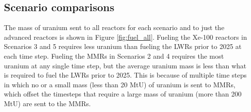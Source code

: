 \subsection{Scenario comparisons}
The mass of uranium sent to all reactors for each scenario and to just the 
advanced reactors is shown in Figure \ref{fig:fuel_all}. Fueling the Xe-100 
reactors in Scenarios 3 and 5 requires less uranium than fueling the \glspl{LWR}
prior to 2025
at each time step. Fueling the \glspl{MMR} in Scenarios 2 and 4 requires the 
most uranium at any single time step, but the average uranium mass is less 
than what is required to fuel the \glspl{LWR} prior to 2025. This is because 
of multiple time steps in which no or a small mass (less than 20 MtU) 
of uranium is sent to \glspl{MMR}, which offset the timesteps that require 
a large mass of uranium (more than 200 MtU) are sent to the \glspl{MMR}. 

